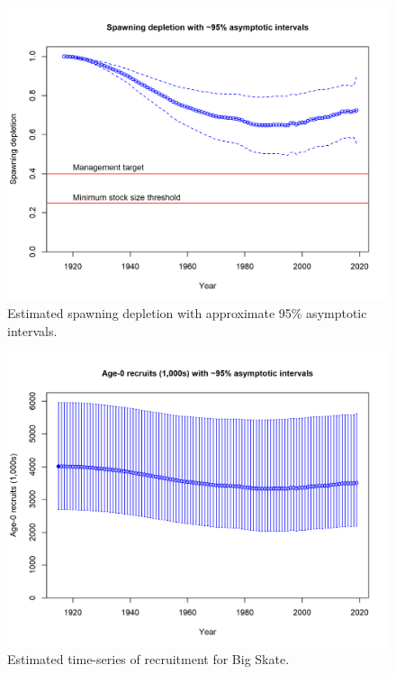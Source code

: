 \documentclass[12pt,]{article}
\begin{document}
\begin{figure}
\centering
\includegraphics{r4ss/plots_mod1/ts9_Spawning_depletion_with_95_asymptotic_intervals_intervals.png}
\caption{Estimated spawning depletion with approximate 95\% asymptotic
intervals.
\label{fig:ts9_Spawning_depletion_with_95_asymptotic_intervals_intervals}}
\end{figure}

\begin{figure}
\centering
\includegraphics{r4ss/plots_mod1/ts11_Age-0_recruits_(1000s)_with_95_asymptotic_intervals.png}
\caption{Estimated time-series of recruitment for Big Skate.
\label{fig:ts11_Age-0_recruits_(1000s)_with_95_asymptotic_intervals}}
\end{figure}
\end{document}
